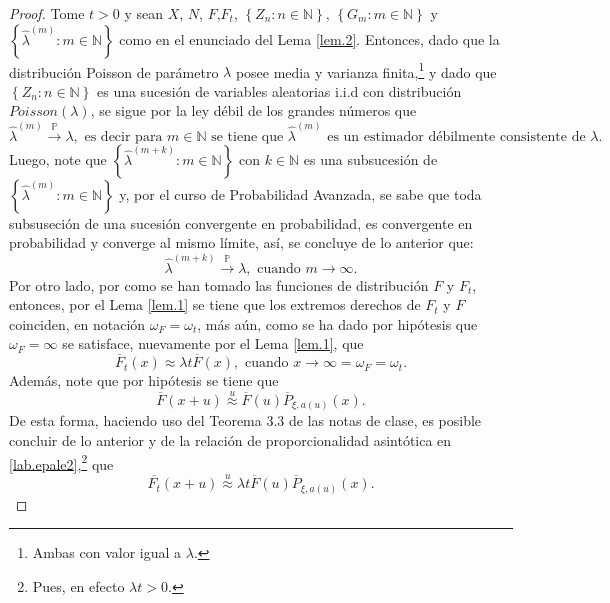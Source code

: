 \documentclass[10.5pt,notitlepage]{article}
\newcommand{\PP}{\mathbb{P}}
\newcommand{\NN}{\mathbb{N}}
\newcommand{\toPP}{\overset{\PP}{\to}}
\newcommand{\approxu}{\overset{u}{\approx}}
\newcommand{\kis}[1]{\left\{ #1 \right\}}
\theoremstyle{plain}
\begin{document}
\begin{proof}
Tome \(t > 0\) y sean \(X\), \(N\), \(F\),\(F_{t}\), \(\kis{Z_{n} : n \in \NN}\), \(\kis{G_{m} : m \in \NN}\) y \(\kis{\hat{\lambda}^{(m)} : m \in \NN}\) como en el enunciado del Lema \ref{lem.2}. Entonces, dado que la distribución Poisson de parámetro \(\lambda\) posee media y varianza finita,\footnote{Ambas con valor igual a \(\lambda\).} y dado que \(\kis{Z_{n} : n \in \NN}\) es una sucesión de variables aleatorias i.i.d con distribución \(Poisson(\lambda)\), se sigue por la ley débil de los grandes números que 
\begin{equation*}
\hat{\lambda}^{(m)} \toPP \lambda, \text{ es decir para \(m \in \NN\) se tiene que } \hat{\lambda}^{(m)} \text{ es un estimador débilmente consistente de \(\lambda\).}    
\end{equation*}  
Luego, note que \(\kis{\hat{\lambda}^{(m+k)} : m \in \NN}\) con \(k\in \NN\) es una subsucesión de \(\kis{\hat{\lambda}^{(m)} : m \in \NN}\) y, por el curso de Probabilidad Avanzada, se sabe que toda subsuseción de una sucesión convergente en probabilidad, es convergente en probabilidad y converge al mismo límite, así, se concluye de lo anterior que: 
\begin{equation}\label{lab.104}
    \hat{\lambda}^{(m + k)} \toPP \lambda, \text{ cuando } m \to \infty.   
\end{equation}
Por otro lado, por como se han tomado las funciones de distribución \(F\) y \(F_t\), entonces, por el Lema \ref{lem.1} se tiene que los extremos derechos de \(F_t\) y \(F\) coinciden, en notación  \(\omega_{F} = \omega_{t}\), más aún, como se ha dado por hipótesis que \(\omega_{F} = \infty\) se satisface, nuevamente por el Lema \ref{lem.1}, que
\begin{equation}\label{lab.epale2}
  \overline{F}_{t}(x) \approx \lambda t \overline{F}(x), \text{ cuando } x \to \infty =\omega_{F} = \omega_{t}.  
\end{equation}
Además, note que por hipótesis se tiene que 
\begin{equation}\label{lab.epale}
    \overline{F}(x + u) \approxu \overline{F}(u)\overline{P}_{\xi,a(u)}(x). 
\end{equation}
De esta forma, haciendo uso del Teorema 3.3 de las notas de clase, es posible concluir de lo anterior y de la relación de proporcionalidad asintótica en \eqref{lab.epale2},\footnote{Pues, en efecto \(\lambda t>0 \).} que
\begin{equation*}
\overline{F_t}(x + u) \approxu \lambda t \overline{F}(u)\overline{P}_{\xi,a(u)}(x).     

\end{equation*}
\end{proof}
\end{document}
